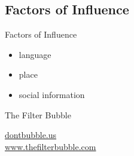 \subsection{Factors of Influence}
\begin{frame}{Factors of Influence}
	\begin{itemize}[<+->]
		\item language
		\item place
		\item social information
	\end{itemize}
\end{frame}

\begin{frame}{The Filter Bubble}
	\begin{center}
		\href{http://dontbubble.us}{dontbubble.us}\\
		\href{http://www.thefilterbubble.com/}{www.thefilterbubble.com}
	\end{center}
\end{frame}

